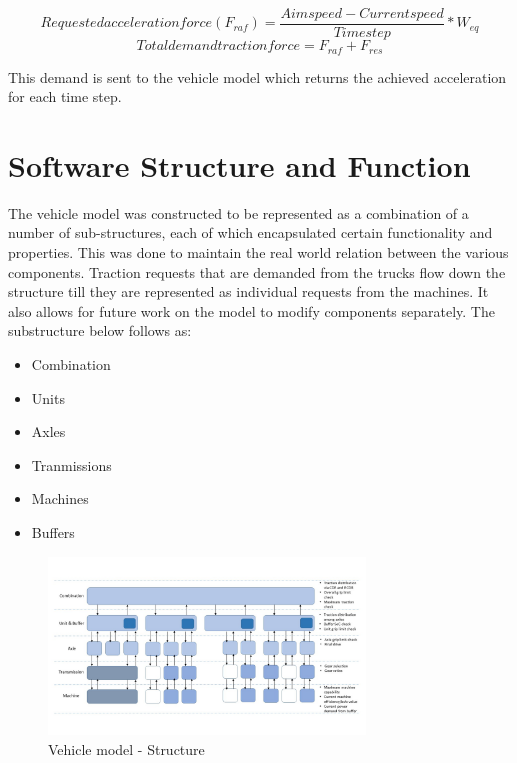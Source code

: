 \documentclass[ExampleMasters.tex]{subfiles}
\begin{document}
\begin{equation} \label{eq:reqacclforce}
Requested acceleration force(F_{raf}) =\frac {Aim speed- Current speed}{Time step}*W_{eq}
\end{equation}
\begin{equation} \label{eq:totdemforce}
Total demand traction force = F_{raf}+F_{res}
\end{equation}

This demand is sent to the vehicle model which returns the achieved acceleration for each time step.

\section{Software Structure and Function}
The vehicle model was constructed to be represented as a combination of a number of sub-structures, each of which encapsulated certain functionality and properties. This was done to maintain the real world relation between the various components. Traction requests that are demanded from the trucks flow down the structure till they are represented as individual requests from the machines. It also allows for future work on the model to modify components separately. The substructure below follows as:

\begin{itemize}
\item Combination
\item Units
\item Axles
\item Tranmissions
\item Machines
\item Buffers
\end{itemize}

\begin{figure}[ht]
	\begin{center}
		\includegraphics[width=0.75\textwidth]{figures/VehicleModel/vehiclelayout.jpg}
	\end{center}
	\caption{Vehicle model - Structure}
	\label{fig:vehiclelayout}
\end{figure}
\end{document}

